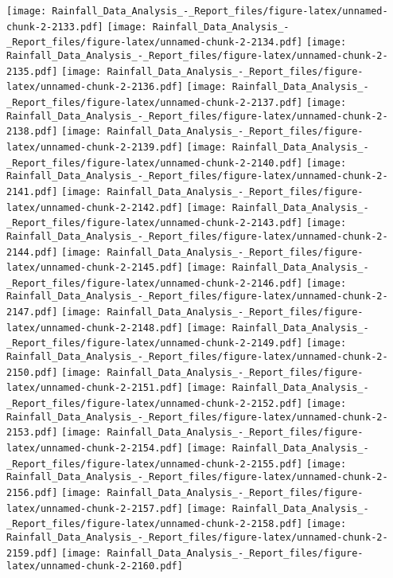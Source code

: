 \documentclass[
]{article}
\begin{document}
\texttt{[image: Rainfall\_Data\_Analysis\_-\_Report\_files/figure-latex/unnamed-chunk-2-2133.pdf]}
\texttt{[image: Rainfall\_Data\_Analysis\_-\_Report\_files/figure-latex/unnamed-chunk-2-2134.pdf]}
\texttt{[image: Rainfall\_Data\_Analysis\_-\_Report\_files/figure-latex/unnamed-chunk-2-2135.pdf]}
\texttt{[image: Rainfall\_Data\_Analysis\_-\_Report\_files/figure-latex/unnamed-chunk-2-2136.pdf]}
\texttt{[image: Rainfall\_Data\_Analysis\_-\_Report\_files/figure-latex/unnamed-chunk-2-2137.pdf]}
\texttt{[image: Rainfall\_Data\_Analysis\_-\_Report\_files/figure-latex/unnamed-chunk-2-2138.pdf]}
\texttt{[image: Rainfall\_Data\_Analysis\_-\_Report\_files/figure-latex/unnamed-chunk-2-2139.pdf]}
\texttt{[image: Rainfall\_Data\_Analysis\_-\_Report\_files/figure-latex/unnamed-chunk-2-2140.pdf]}
\texttt{[image: Rainfall\_Data\_Analysis\_-\_Report\_files/figure-latex/unnamed-chunk-2-2141.pdf]}
\texttt{[image: Rainfall\_Data\_Analysis\_-\_Report\_files/figure-latex/unnamed-chunk-2-2142.pdf]}
\texttt{[image: Rainfall\_Data\_Analysis\_-\_Report\_files/figure-latex/unnamed-chunk-2-2143.pdf]}
\texttt{[image: Rainfall\_Data\_Analysis\_-\_Report\_files/figure-latex/unnamed-chunk-2-2144.pdf]}
\texttt{[image: Rainfall\_Data\_Analysis\_-\_Report\_files/figure-latex/unnamed-chunk-2-2145.pdf]}
\texttt{[image: Rainfall\_Data\_Analysis\_-\_Report\_files/figure-latex/unnamed-chunk-2-2146.pdf]}
\texttt{[image: Rainfall\_Data\_Analysis\_-\_Report\_files/figure-latex/unnamed-chunk-2-2147.pdf]}
\texttt{[image: Rainfall\_Data\_Analysis\_-\_Report\_files/figure-latex/unnamed-chunk-2-2148.pdf]}
\texttt{[image: Rainfall\_Data\_Analysis\_-\_Report\_files/figure-latex/unnamed-chunk-2-2149.pdf]}
\texttt{[image: Rainfall\_Data\_Analysis\_-\_Report\_files/figure-latex/unnamed-chunk-2-2150.pdf]}
\texttt{[image: Rainfall\_Data\_Analysis\_-\_Report\_files/figure-latex/unnamed-chunk-2-2151.pdf]}
\texttt{[image: Rainfall\_Data\_Analysis\_-\_Report\_files/figure-latex/unnamed-chunk-2-2152.pdf]}
\texttt{[image: Rainfall\_Data\_Analysis\_-\_Report\_files/figure-latex/unnamed-chunk-2-2153.pdf]}
\texttt{[image: Rainfall\_Data\_Analysis\_-\_Report\_files/figure-latex/unnamed-chunk-2-2154.pdf]}
\texttt{[image: Rainfall\_Data\_Analysis\_-\_Report\_files/figure-latex/unnamed-chunk-2-2155.pdf]}
\texttt{[image: Rainfall\_Data\_Analysis\_-\_Report\_files/figure-latex/unnamed-chunk-2-2156.pdf]}
\texttt{[image: Rainfall\_Data\_Analysis\_-\_Report\_files/figure-latex/unnamed-chunk-2-2157.pdf]}
\texttt{[image: Rainfall\_Data\_Analysis\_-\_Report\_files/figure-latex/unnamed-chunk-2-2158.pdf]}
\texttt{[image: Rainfall\_Data\_Analysis\_-\_Report\_files/figure-latex/unnamed-chunk-2-2159.pdf]}
\texttt{[image: Rainfall\_Data\_Analysis\_-\_Report\_files/figure-latex/unnamed-chunk-2-2160.pdf]}
\end{document}
